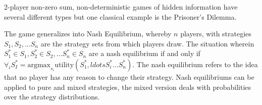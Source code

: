 \documentclass{article}
\begin{document}
2-player non-zero sum, non-deterministic games of hidden information have
several different types but one classical example is the Prisoner's Dilemma. 

The game generalizes into Nash Equilibrium, whereby $n$ players, with strategies
$S_1, S_2, \ldots S_n$ are the strategy sets from which players draw. The
situation wherein $S_1^* \in S_1, S_2^* \in S_2, \ldots S_n^* \in S_n$ are a
nash equilibrium if and only if $\forall_i S_I^* = \text{argmax}_{s_i} 
\text{utility}(S_1^*,ldots S_i^* \ldots S_n^*)$. The nash equilibrium refers to 
the idea that no player has any reason to change their strategy. Nash
equilibriums can be applied to pure and mixed strategies, the mixed version 
deals with probabilities over the strategy distributions. 
\end{document}
